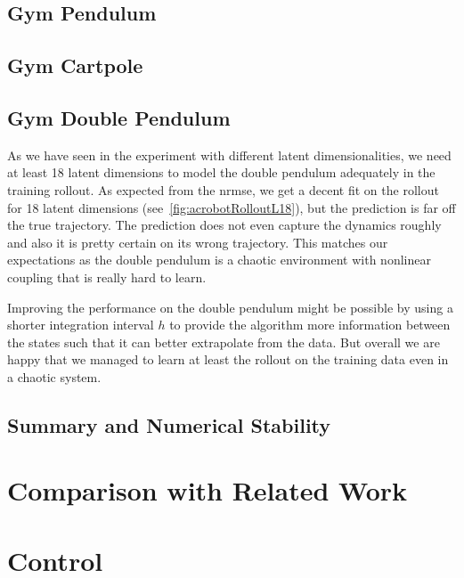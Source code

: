 	\subsection{Gym Pendulum}

	\subsection{Gym Cartpole}

	\subsection{Gym Double Pendulum}
		As we have seen in the experiment with different latent dimensionalities, we need at least 18 latent dimensions to model the double pendulum adequately in the training rollout. As expected from the \ac{nrmse}, we get a decent fit on the rollout for 18 latent dimensions (see~\autoref{fig:acrobotRolloutL18}), but the prediction is far off the true trajectory. The prediction does not even capture the dynamics roughly and also it is pretty certain on its wrong trajectory. This matches our expectations as the double pendulum is a chaotic environment with nonlinear coupling that is really hard to learn.

		Improving the performance on the double pendulum might be possible by using a shorter integration interval \(h\) to provide the algorithm more information between the states such that it can better extrapolate from the data. But overall we are happy that we managed to learn at least the rollout on the training data even in a chaotic system.

	\subsection{Summary and Numerical Stability}
		\label{subsec:discussPerformanceNumerics}


\section{Comparison with Related Work}


\section{Control}  %

